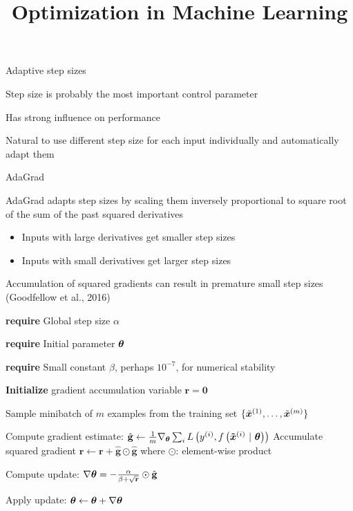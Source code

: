 \documentclass[11pt,compress,t,notes=noshow, xcolor=table]{beamer}
\title{Optimization in Machine Learning}
\begin{document}


\begin{framei}{Adaptive step sizes}
\item Step size is probably the most important control parameter
\item Has strong influence on performance
\item Natural to use different step size for each input individually and automatically adapt them
\vfill
{}
\end{framei}


\begin{framei}[fs=footnotesize]{AdaGrad}
\item AdaGrad adapts step sizes by
scaling them inversely proportional to square root of the sum of the past squared derivatives
\begin{itemize}
\item Inputs with large derivatives get smaller step sizes
\item Inputs with small derivatives get larger step sizes
\end{itemize}
\item Accumulation of squared gradients can result in premature small step sizes (Goodfellow et al., 2016)
\begin{algorithm}[H]
\footnotesize
\caption{AdaGrad}
\begin{algorithmic}[1]
\State \textbf{require} Global step size $\alpha$ \strut
\State \textbf{require} Initial parameter $\bm{\theta}$ \strut
\State \textbf{require} Small constant $\beta$, perhaps $10^{-7}$, for numerical stability \strut
\State \textbf{Initialize} gradient accumulation variable $\mathbf{r} = \mathbf{0} $
\State \parbox[t]{\dimexpr\linewidth-\algorithmicindent}{Sample minibatch of $m$ examples from the training set $\{\tilde{\bm{x}}^{(1)},\dots,\tilde{\bm{x}}^{(m)}\}$ \strut}
\State Compute gradient estimate: $\hat{\mathbf{g}} \leftarrow \frac{1}{m} \nabla_{\bm{\theta}} \sum_{i} L\left(y^{(i)}, f\left(\bm{\tilde{x}}^{(i)} ~|~ \bm{\theta}\right)\right)$
\State Accumulate squared gradient $\mathbf{r} \leftarrow \mathbf{r} + \hat{\mathbf{g}} \odot  \hat{\mathbf{g}}$ where $\odot$: element-wise product %
\State \parbox[t]{\dimexpr\linewidth-\algorithmicindent}{Compute update: $\nabla \bm{\theta} = - \frac{\alpha}{\beta + \sqrt\mathbf{r}} \odot \hat{\mathbf{g}}$ \strut}
\State Apply update: $\bm{\theta} \leftarrow \bm{\theta} + \nabla\bm{\theta}$
\EndWhile
\end{algorithmic}
\end{algorithm}
\end{framei}
\end{document}
